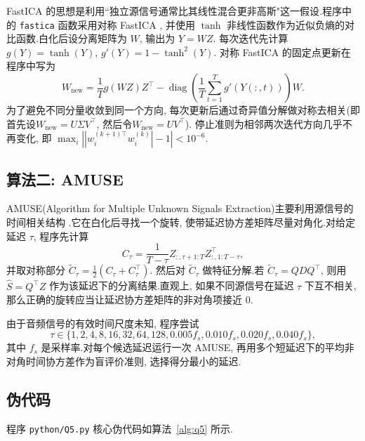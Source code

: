 ﻿\documentclass[UTF8,  zihao=-4]{ctexart}
\begin{document}
FastICA 的思想是利用``独立源信号通常比其线性混合更非高斯"这一假设.程序中的 \texttt{fastica} 函数采用对称 FastICA \cite{Hyvarinen1999FastICA},  并使用 \(\tanh\) 非线性函数作为近似负熵的对比函数.白化后设分离矩阵为 \(W\),  输出为
\(Y=WZ\).
每次迭代先计算
\(g(Y)=\tanh(Y)\),  \(g'(Y)=1-\tanh^2(Y)\).
对称 FastICA 的固定点更新在程序中写为
\begin{equation}
    W_{\mathrm{new}}
    =
    \frac{1}{T}g(WZ)Z^\top
    -
    \operatorname{diag}
    \left(
        \frac{1}{T}\sum_{t=1}^T g'(Y(:,  t))
    \right)W.
\end{equation}
为了避免不同分量收敛到同一个方向,  每次更新后通过奇异值分解做对称去相关(即首先设$W_{\mathrm{new}}=U\Sigma V^\top$,  然后令$W_{\mathrm{new}}=UV^\top$).
停止准则为相邻两次迭代方向几乎不再变化,  即
\(\max_i\left||w_i^{(k+1)\top}w_i^{(k)}|-1\right|<10^{-6}\).

\subsection{算法二: AMUSE}

AMUSE(Algorithm for Multiple Unknown Signals Extraction)主要利用源信号的时间相关结构 \cite{Tong1991Indeterminacy}.它在白化后寻找一个旋转,  使带延迟协方差矩阵尽量对角化.对给定延迟 \(\tau\),  程序先计算
\begin{equation}
    C_\tau
    =
    \frac{1}{T-\tau}Z_{:,  \tau+1: T}Z_{:,  1: T-\tau}^{\top},  
\end{equation}
并取对称部分
\(\widetilde C_\tau=\frac{1}{2}(C_\tau+C_\tau^\top)\).
然后对 \(\widetilde C_\tau\) 做特征分解.若
\(\widetilde C_\tau=QDQ^\top\),  
则用
\(\hat S=Q^\top Z\)
作为该延迟下的分离结果.直观上,  如果不同源信号在延迟 \(\tau\) 下互不相关,  那么正确的旋转应当让延迟协方差矩阵的非对角项接近 \(0\).

由于音频信号的有效时间尺度未知,  程序尝试
\[\tau\in\{1,  2,  4,  8,  16,  32,  64,  128,  0.005f_s,  0.010f_s,  0.020f_s,  0.040f_s\},  \]
其中 \(f_s\) 是采样率.对每个候选延迟运行一次 AMUSE,  再用多个短延迟下的平均非对角时间协方差作为盲评价准则,  选择得分最小的延迟.

\subsection{伪代码}

程序 \texttt{python/Q5.py} 核心伪代码如算法~\ref{alg:q5} 所示.
\end{document}
